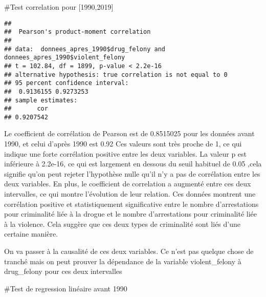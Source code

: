 \documentclass[
]{article}
\newenvironment{Shaded}{\begin{snugshade}}{\end{snugshade}}
\newcommand{\FunctionTok}[1]{\textcolor[rgb]{0.13,0.29,0.53}{\textbf{#1}}}
\newcommand{\NormalTok}[1]{#1}
\newcommand{\SpecialCharTok}[1]{\textcolor[rgb]{0.81,0.36,0.00}{\textbf{#1}}}
\begin{document}
\#Test correlation pour {[}1990,2019{]}

\begin{Shaded}
\end{Shaded}

\begin{verbatim}
## 
##  Pearson's product-moment correlation
## 
## data:  donnees_apres_1990$drug_felony and donnees_apres_1990$violent_felony
## t = 102.84, df = 1899, p-value < 2.2e-16
## alternative hypothesis: true correlation is not equal to 0
## 95 percent confidence interval:
##  0.9136155 0.9273253
## sample estimates:
##       cor 
## 0.9207542
\end{verbatim}

Le coefficient de corrélation de Pearson est de 0.8515025 pour les
données avant 1990, et celui d'après 1990 est 0.92 Ces valeurs sont très
proche de 1, ce qui indique une forte corrélation positive entre les
deux variables. La valeur p est inférieure à 2.2e-16, ce qui est
largement en dessous du seuil habituel de 0.05 ,cela signifie qu'on peut
rejeter l'hypothèse nulle qu'il n'y a pas de corrélation entre les deux
variables. En plus, le coefficient de correlation a augmenté entre ces
deux intervalles, ce qui montre l'évolution de leur relation. Ces
données montrent une corrélation positive et statistiquement
significative entre le nombre d'arrestations pour criminalité liée à la
drogue et le nombre d'arrestations pour criminalité liée à la violence.
Cela suggère que ces deux types de criminalité sont liés d'une certaine
manière.

On va passer à la causalité de ces deux variables. Ce n'est pas quelque
chose de tranché mais on peut prouver la dépendance de la variable
violent\_felony à drug\_felony pour ces deux intervalles

\#Test de regression linéaire avant 1990

\begin{Shaded}
\end{Shaded}
\end{document}
